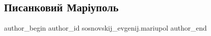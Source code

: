  
 
 
 
 
 
\subsection{Писанковий Маріуполь}
\label{sec:30_04_2019.fb.sosnovskij_evgenij.mariupol.1.pystankovyj_mariupol}
 
\ifcmt
 author_begin
   author_id sosnovskij_evgenij.mariupol
 author_end
\fi
